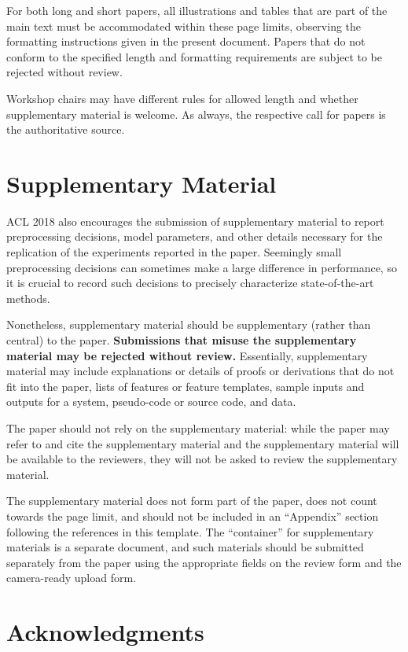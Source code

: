 \documentclass[11pt,a4paper]{article}
\begin{document}
For both long and short papers, all illustrations and tables that are part
of the main text must be accommodated within these page limits, observing
the formatting instructions given in the present document. 
Papers that do not conform to the specified length and 
formatting requirements are subject to be rejected without
review.

Workshop chairs may have different rules for allowed length and
whether supplementary material is welcome. As always, the respective
call for papers is the authoritative source.

\section{Supplementary Material}
\label{sec:supplemental}
ACL 2018 also encourages the submission of supplementary material
to report preprocessing decisions, model parameters, and other details
necessary for the replication of the experiments reported in the 
paper. Seemingly small preprocessing decisions can sometimes make
a large difference in performance, so it is crucial to record such
decisions to precisely characterize state-of-the-art methods.

Nonetheless, supplementary material should be supplementary (rather
than central) to the paper. \textbf{Submissions that misuse the supplementary 
material may be rejected without review.}
Essentially, supplementary material may include explanations or details
of proofs or derivations that do not fit into the paper, lists of
features or feature templates, sample inputs and outputs for a system,
pseudo-code or source code, and data. 

The paper should not rely on the supplementary material: while the paper
may refer to and cite the supplementary material and the supplementary material will be available to the
reviewers, they will not be asked to review the
supplementary material.

The supplementary material does not form part of the paper, does not count towards the page limit, and should not be included in an ``Appendix'' section following the references in this template. The ``container'' for supplementary materials is a separate document, and such materials should be submitted separately from the paper using the appropriate fields on the review form and the camera-ready upload form. 

\section*{Acknowledgments}
\end{document}
